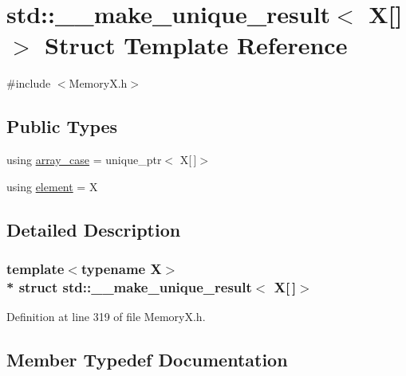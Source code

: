\hypertarget{structstd_1_1____make__unique__result_3_01_x[]_4}{}\section{std\+:\+:\+\_\+\+\_\+make\+\_\+unique\+\_\+result$<$ X\mbox{[}\mbox{]}$>$ Struct Template Reference}
\label{structstd_1_1____make__unique__result_3_01_x[]_4}


{\ttfamily \#include $<$Memory\+X.\+h$>$}

\subsection*{Public Types}
\begin{DoxyCompactItemize}
\item 
using \hyperlink{structstd_1_1____make__unique__result_3_01_x[]_4_ae15324f7a78c793a870a1f668faa219f}{array\+\_\+case} = unique\+\_\+ptr$<$ X\mbox{[}$\,$\mbox{]}$>$
\item 
using \hyperlink{structstd_1_1____make__unique__result_3_01_x[]_4_a065f62811af74c831185d39e38fa3c45}{element} = X
\end{DoxyCompactItemize}


\subsection{Detailed Description}
\subsubsection*{template$<$typename X$>$\\*
struct std\+::\+\_\+\+\_\+make\+\_\+unique\+\_\+result$<$ X\mbox{[}$\,$\mbox{]}$>$}



Definition at line 319 of file Memory\+X.\+h.



\subsection{Member Typedef Documentation}
